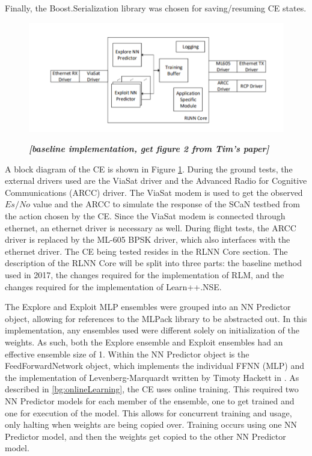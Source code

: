 \par Finally, the Boost.Serialization \cite{placeholderCitation} library was chosen for saving/resuming CE states. 
\begin{figure}
\caption{\textbf{\textit{[baseline implementation, get figure 2 from Tim's paper]}}}
\includegraphics[width=\textwidth]{figures/driverList_tmp.png}
\label{fig:timOutlineBlocks}
\end{figure}
\par A block diagram of the CE is shown in Figure \ref{fig:timOutlineBlocks}. During the ground tests, the external drivers used are the ViaSat driver and the Advanced Radio for Cognitive Communications (ARCC) driver. The ViaSat modem is used to get the observed $Es/No$ value and the ARCC to simulate the response of the SCaN testbed from the action chosen by the CE. Since the ViaSat modem is connected through ethernet, an ethernet driver is necessary as well. During flight tests, the ARCC driver is replaced by the ML-605 BPSK driver, which also interfaces with the ethernet driver. The CE being tested resides in the RLNN Core section. The description of the RLNN Core will be split into three parts: the baseline method used in 2017, the changes required for the implementation of RLM, and the changes required for the implementation of Learn++.NSE.
\par The Explore and Exploit MLP ensembles were grouped into an NN Predictor object, allowing for references to the MLPack library to be abstracted out. In this implementation, any ensembles used were different solely on initialization of the weights. As such, both the Explore ensemble and Exploit ensembles had an effective ensemble size of 1. Within the NN Predictor object is the FeedForwardNetwork object, which implements the individual FFNN (MLP) and the implementation of Levenberg-Marquardt written by Timoty Hackett in \cite{tim_implementation_paper}. As described in \ref{bg:onlineLearning}, the CE uses online training. This required two NN Predictor models for each member of the ensemble, one to get trained and one for execution of the model. This allows for concurrent training and usage, only halting when weights are being copied over. Training occurs using one NN Predictor model, and then the weights get copied to the other NN Predictor model. 
